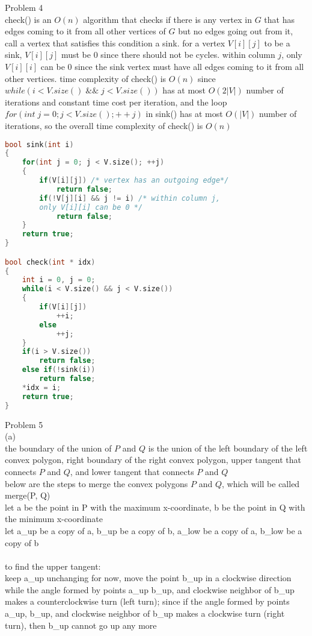 \documentclass[12pt,border=4pt,multi]{article} %
\begin{document}
\newpage
\noindent
Problem 4\\
check() is an $O(n)$ algorithm that checks if there is any vertex in $G$ that has edges coming to it from all other vertices of $G$ but no edges going out from it, call a vertex that satisfies this condition a sink. for a vertex $V[i][j]$ to be a sink, $V[i][j]$ must be 0 since there should not be cycles. within column $j$, only $V[i][i]$ can be 0 since the sink vertex must have all edges coming to it from all other vertices. time complexity of check() is $O(n)$ since $while(i < V.size() \;\&\&\; j < V.size())$ has at most $O(2|V|)$ number of iterations and constant time cost per iteration, and the loop $for(int\;j = 0; j < V.size(); ++j)$ in sink() has at most $O(|V|)$ number of iterations, so the overall time complexity of check() is $O(n)$
\begin{lstlisting}[language = c]
bool sink(int i)
{
    for(int j = 0; j < V.size(); ++j)
    {
        if(V[i][j]) /* vertex has an outgoing edge*/
            return false;
        if(!V[j][i] && j != i) /* within column j,
        only V[i][i] can be 0 */
            return false;
    }
    return true;
}

bool check(int * idx)
{
    int i = 0, j = 0;
    while(i < V.size() && j < V.size())
    {
        if(V[i][j])
            ++i;
        else    
            ++j;
    }
    if(i > V.size())
        return false;
    else if(!sink(i))
        return false;
    *idx = i;
    return true;
}
\end{lstlisting}
\newpage
\noindent
Problem 5\\
(a)\\
the boundary of the union of $P$ and $Q$ is the union of the left boundary of the left convex polygon, right boundary of the right convex polygon, upper tangent that connects $P$ and $Q$, and lower tangent that connects $P$ and $Q$\\
below are the steps to merge the convex polygons $P$ and $Q$, which will be called merge(P, Q)\\
let a be the point in P with the maximum x-coordinate, b be the point in Q with the minimum x-coordinate\\
let a\_up be a copy of a, b\_up be a copy of b, a\_low be a copy of a, b\_low be a copy of b\\
\\
to find the upper tangent:\\
keep a\_up unchanging for now, move the point b\_up in a clockwise direction while the angle formed by points a\_up b\_up, and clockwise neighbor of b\_up makes a counterclockwise turn (left turn); since if the angle formed by points a\_up, b\_up, and clockwise neighbor of b\_up makes a clockwise turn (right turn), then b\_up cannot go up any more\\
\end{document}
